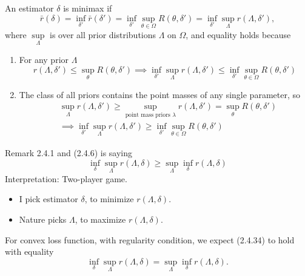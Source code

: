 \documentclass[a4paper]{article}
\begin{document}
\begin{remark}
	An estimator $\delta$ is minimax if
	\begin{equation}
		\bar{r}(\delta) = \inf\limits_{\delta'} \bar{r}(\delta') = \inf\limits_{\delta'} \sup\limits_{\theta \in \Omega} R(\theta,\delta') = \inf\limits_{\delta'} \sup\limits_{\Lambda} r(\Lambda,\delta'),
	\end{equation}
	where $\sup\limits_{\Lambda}$ is over all prior distributions $\Lambda$ on $\Omega$, and equality holds because
	\begin{enumerate}
		\item For any prior $\Lambda$
		\begin{equation}
			r(\Lambda,\delta') \leq \sup\limits_{\theta}R(\theta,\delta') \implies \inf\limits_{\delta'} \sup\limits_{\Lambda} r(\Lambda,\delta') \leq  \inf\limits_{\delta'} \sup\limits_{\theta \in \Omega} R(\theta,\delta')
		\end{equation}
		\item The class of all priors contains the point masses of any single parameter, so
		\begin{equation}
			\begin{aligned}
				& \sup\limits_{\Lambda} r(\Lambda,\delta') \geq \sup\limits_{\text{point mass priors } \lambda} r(\Lambda,\delta') = \sup\limits_{\theta}R(\theta,\delta') \\
				& \implies \inf\limits_{\delta'} \sup\limits_{\Lambda} r(\Lambda,\delta') \geq \inf\limits_{\delta'} \sup\limits_{\theta \in \Omega} R(\theta,\delta')
			\end{aligned}
		\end{equation}
	\end{enumerate}
	Remark 2.4.1 and (2.4.6) is saying
	\begin{equation}
		\inf\limits_{\delta} \sup\limits_{\Lambda} r(\Lambda,\delta) \geq \sup\limits_{\Lambda} \inf\limits_{\delta}  r(\Lambda,\delta)
	\end{equation}
	Interpretation: Two-player game.
	\begin{itemize}
		\item I pick estimator $\delta$, to minimize $r(\Lambda,\delta)$.
		\item Nature picks $\Lambda$, to maximize $r(\Lambda,\delta)$. 
	\end{itemize}
	For convex loss function, with regularity condition, we expect (2.4.34) to hold with equality
	\begin{equation}
		\inf\limits_{\delta} \sup\limits_{\Lambda} r(\Lambda,\delta) = \sup\limits_{\Lambda} \inf\limits_{\delta}  r(\Lambda,\delta).

\end{equation}
\end{remark}
\end{document}
